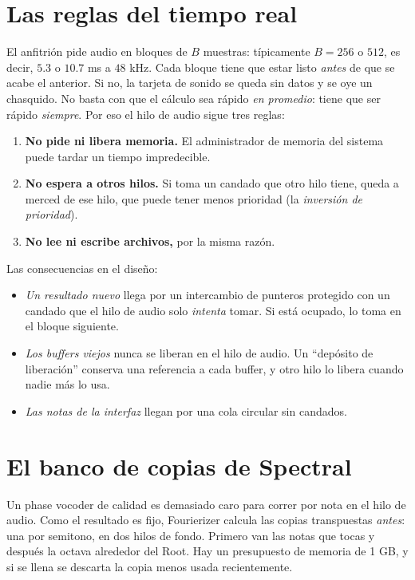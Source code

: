 \section{Las reglas del tiempo real}

El anfitrión pide audio en bloques de $B$ muestras: típicamente $B=256$ o $512$, es decir, $5.3$ o
$10.7$ ms a $48$ kHz. Cada bloque tiene que estar listo \emph{antes} de que se acabe el anterior. Si
no, la tarjeta de sonido se queda sin datos y se oye un chasquido. No basta con que el cálculo sea
rápido \emph{en promedio}: tiene que ser rápido \emph{siempre}. Por eso el hilo de audio sigue tres
reglas:
\begin{enumerate}
  \item \textbf{No pide ni libera memoria.} El administrador de memoria del sistema puede tardar un
        tiempo impredecible.
  \item \textbf{No espera a otros hilos.} Si toma un candado que otro hilo tiene, queda a merced de
        ese hilo, que puede tener menos prioridad (la \emph{inversión de prioridad}).
  \item \textbf{No lee ni escribe archivos,} por la misma razón.
\end{enumerate}

Las consecuencias en el diseño:
\begin{itemize}
  \item \emph{Un resultado nuevo} llega por un intercambio de punteros protegido con un candado que
        el hilo de audio solo \emph{intenta} tomar. Si está ocupado, lo toma en el bloque
        siguiente.
  \item \emph{Los buffers viejos} nunca se liberan en el hilo de audio. Un ``depósito de
        liberación'' conserva una referencia a cada buffer, y otro hilo lo libera cuando nadie más lo
        usa.
  \item \emph{Las notas de la interfaz} llegan por una cola circular sin candados.
\end{itemize}

\section{El banco de copias de Spectral}

Un phase vocoder de calidad es demasiado caro para correr por nota en el hilo de audio. Como el
resultado es fijo, Fourierizer calcula las copias transpuestas \emph{antes}: una por semitono, en dos
hilos de fondo. Primero van las notas que tocas y después la octava alrededor del Root. Hay un
presupuesto de memoria de 1 GB, y si se llena se descarta la copia menos usada recientemente.

